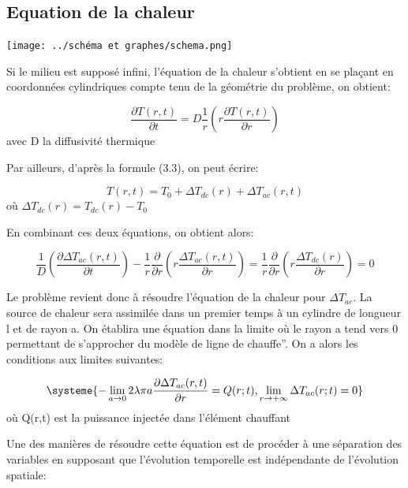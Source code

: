 \documentclass[10pt,a4paper]{report}
\begin{document}
\subsection{Equation de la chaleur}
\begin{center}
\texttt{[image: ../schéma et graphes/schema.png]}
\label{fig2}
\end{center}
Si le milieu est supposé infini, l’équation de la chaleur s’obtient en se plaçant en coordonnées cylindriques compte tenu de la géométrie du problème, on obtient:
\begin{center}
\begin{equation}
\frac{\partial T(r,t)}{\partial t}=D\frac{1}{r}(r\frac{\partial T(r,t)}{\partial r})
\end{equation}
avec D la diffusivité thermique
\end{center}
Par ailleurs, d'après la formule (3.3), on peut écrire:
\begin{center}
\begin{equation}
T(r,t)=T_{0}+\Delta T_{dc}(r)+\Delta T_{ac}(r,t)
\end{equation}
où $\Delta T_{dc}(r)=T_{dc}(r)-T_{0}$
\end{center}
En combinant ces deux équations, on obtient alors:
\begin{center}
\begin{equation}
\frac{1}{D}(\frac{\partial \Delta T_{ac}(r,t)}{\partial t})-\frac{1}{r}\frac{\partial}{\partial r}(r\frac{\Delta T_{ac}(r,t)}{\partial r})=\frac{1}{r}\frac{\partial}{\partial r}(r\frac{\Delta T_{dc}(r)}{\partial r})=0
\end{equation}
\end{center}
Le problème revient donc à résoudre l’équation de la chaleur pour $\Delta T_{ac}$. La source de chaleur sera assimilée dans un premier temps à un cylindre de longueur l et de rayon a. On établira une équation dans la limite où le rayon a tend vers 0 permettant de s’approcher du modèle de ligne de chauffe”. On a alors les conditions aux limites suivantes:
\begin{center}
\begin{equation}
\systeme{-\lim\limits_{a \rightarrow 0}2\lambda\pi a\frac{\partial \Delta T_{ac}(r,t)}{\partial r}=Q(r;t),\lim\limits_{r \rightarrow +\infty}\Delta T_{ac}(r;t)=0}
\end{equation}
où Q(r,t) est la puissance injectée dans l'élément chauffant
\end{center}
Une des manières de résoudre cette équation est de procéder à une séparation des variables en supposant que l'évolution temporelle est indépendante de l’évolution spatiale:
\end{document}
